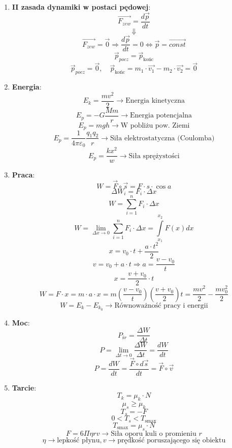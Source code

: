 \documentclass{article}
\begin{document}
\begin{enumerate}
		\item \textbf{II zasada dynamiki w postaci pędowej}:
		\[
		\overrightarrow{F_{zew}} = \frac{d \vec{p}}{dt}
		\]
		\[
		\Downarrow
		\]
		\[
		\overrightarrow{F_{zew}} = \vec{0} \Rightarrow \frac{d \vec{p}}{dt} = 0 \Leftrightarrow \vec{p} = \overrightarrow{const}
		\]
		\[
		\vec{p}_{pocz} = \vec{p}_{\text{końc}}
		\]
		\[
		\vec{p}_{pocz} = \vec{0}, \quad \vec{p}_{\text{końc}}= m_1 \cdotp \overrightarrow{v_1} - m_2 \cdotp \overrightarrow{v_2} = \vec{0}
		\]
		
		\item \textbf{Energia}:
		\[
		E_k = \frac{mv^2}{2} \longrightarrow \text{Energia kinetyczna}
		\]
		\[
		E_p = -G \frac{Mm}{r} \longrightarrow \text{Energia potencjalna}
		\]
		\[
		E_p = mgh \longrightarrow \text{W pobliżu pow. Ziemi}
		\]
		\[
		E_p = \frac{1}{4 \pi \varepsilon_0} \frac{q_1 q_2}{r} \longrightarrow \text{Siła elektrostatyczna (Coulomba)}
		\]
		\[
		E_p = \frac{kx^2}{w} \longrightarrow \text{Siła sprężystości}
		\]
		\item \textbf{Praca}:
		\[
		W = \vec{F} \circ \vec{s} = F \cdot s \cdot \cos a
		\]
		\[
		\Delta W_i = F_i \cdot \Delta x
		\]
		\[
		W = \sum\limits_{i = 1}^n F_i \cdot \Delta x
		\]
		\[
		W = \lim\limits_{\Delta x \rightarrow 0} \sum\limits_{i = 1}^n F_i \cdot \Delta x = \int\limits_{x_1}^{x_2} F(x)dx
		\]
		\[
		x = v_0 \cdot t + \frac{a \cdot t^2}{2}
		\]
		\[
		v = v_0 + a \cdot t \Rightarrow a = \frac{v - v_0}{t}
		\]
		\[
		x = \frac{v + v_0}{2} \cdot t
		\]
		\[
		W = F \cdot x = m \cdot a \cdot x = m \left( \frac{v - v_0}{t} \right) \left( \frac{v + v_0}{2} \right)t = \frac{mv^2}{2} - \frac{mv_0^2}{2}
		\]
		\[
		W = E_k - E_{k_0} \longrightarrow \text{Równoważność pracy i energii}
		\]
		\item \textbf{Moc}:
		\[
		P_{śr} = \frac{\Delta W}{\Delta t}
		\]
		\[
		P = \lim\limits_{\Delta t \rightarrow 0} \frac{\Delta W}{\Delta t} = \frac{dW}{dt}
		\]
		\[
		P = \frac{dW}{dt} = \frac{\vec{F} \circ d \vec{s}}{dt} = \vec{F} \circ \vec{v}
		\]
		\item \textbf{Tarcie}:
		\[
		T_k = \mu_k \cdot N
		\]
		\[
		\mu_s \geq \mu_k
		\]
		\[
		T_s = -F
		\]
		\[
		0 < T_s < T_{\text{smax}}
		\]
		\[
		T_{\text{smax}} = \mu_s \cdot N
		\]
		\[
		F = 6 \Pi \eta r v \longrightarrow \text{Siła oporu kuli o promieniu } r
		\]
		\[
		\eta \rightarrow \text{lepkość płynu}, v \rightarrow \text{prędkość poruszającego się obiektu}
		\]

\end{enumerate}
\end{document}
